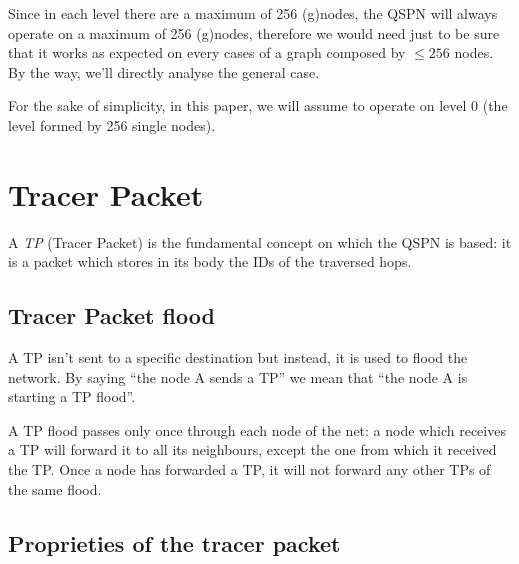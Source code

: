 \documentclass[a4paper]{article}
\begin{document}
Since in each level there are a maximum of 256 (g)nodes, the QSPN will
always operate on a maximum of 256 (g)nodes, therefore we would need just to
be sure that it works as expected on every cases of a graph composed by $\le
256$ nodes. By the way, we'll directly analyse the general case.

For the sake of simplicity, in this paper, we will assume to operate on level
0 (the level formed by 256 single nodes).

\section{Tracer Packet}
\label{sec:TP}

A \emph{TP} (Tracer Packet) is the fundamental concept on which the QSPN is
based: 
it is a packet which stores in its body the IDs of the traversed hops.

\subsection{Tracer Packet flood}
\label{sec:TP_flood}

A TP isn't sent to a specific destination but instead, it is used to flood the
network. By saying ``the node A sends a TP'' we mean that ``the node A is
starting a TP flood''.

A TP flood passes only once through each node of the net: a node which
receives a TP will forward it to all its neighbours, except the one from which
it received the TP. Once a node has forwarded a TP, it will not forward any
other TPs of the same flood.

\subsection{Proprieties of the tracer packet}
\label{sec:proprieties_TP}
\end{document}
